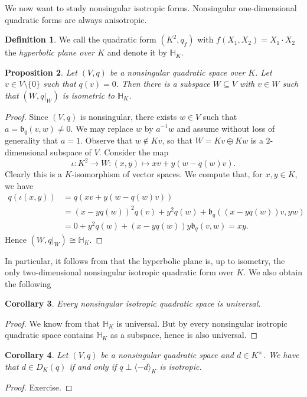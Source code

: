 \documentclass[12pt, leqno, british]{amsart}
\theoremstyle{definition}
\newtheorem{defi}{Definition}[subsection]
\theoremstyle{plain}
\newtheorem{prop}[defi]{Proposition}
\newtheorem{cor}[defi]{Corollary}
\theoremstyle{remark}
\newcommand{\mf}{\mathfrak}
\newcommand{\mbb}{\mathbb}
\begin{document}
We now want to study nonsingular isotropic forms.
Nonsingular one-dimensional quadratic forms are always anisotropic.
\begin{defi}
We call the quadratic form $(K^2, q_f)$ with $f(X_1, X_2) = X_1 \cdot X_2$ the \emph{hyperbolic plane over $K$} and denote it by $\mbb{H}_K$.
\end{defi}
\begin{prop}\label{P:hyperbolic-plane}
Let $(V, q)$ be a nonsingular quadratic space over $K$.
Let $v \in V \setminus \lbrace 0 \rbrace$ such that $q(v) = 0$.
Then there is a subspace $W \subseteq V$ with $v \in W$ such that $(W, q\vert_W)$ is isometric to $\mbb{H}_K$.
\end{prop}
\begin{proof}
Since $(V, q)$ is nonsingular, there exists $w \in V$ such that $a = \mf{b}_q(v, w) \neq 0$.
We may replace $w$ by $a^{-1}w$ and assume without loss of generality that $a = 1$.
Observe that $w \not\in Kv$, so that $W = Kv \oplus Kw$ is a $2$-dimensional subspace of $V$.
Consider the map
$$ \iota : K^2 \to W : (x, y) \mapsto xv + y(w - q(w)v).$$
Clearly this is a $K$-isomorphism of vector spaces.
We compute that, for $x, y \in K$, we have
\begin{align*}
q(\iota(x, y)) &= q(xv + y(w - q(w)v)) \\
&= (x-yq(w))^2 q(v) + y^2q(w) + \mf{b}_q((x - yq(w))v, yw) \\
&= 0 + y^2q(w) + (x - yq(w))y\mf{b}_q(v, w) = xy.
\end{align*}
Hence $(W, q\vert_W) \cong \mbb{H}_K$.
\end{proof}
In particular, it follows from  that the hyperbolic plane is, up to isometry, the only two-dimensional nonsingular isotropic quadratic form over $K$.
We also obtain the following
\begin{cor}\label{C:isotropic->universal}
Every nonsingular isotropic quadratic space is universal.
\end{cor}
\begin{proof}
We know from  that $\mbb{H}_K$ is universal.
But by  every nonsingular isotropic quadratic space contains $\mbb{H}_K$ as a subspace, hence is also universal.
\end{proof}
\begin{cor}\label{C:representation-theorem}
Let $(V, q)$ be a nonsingular quadratic space and $d \in K^\times$.
We have that $d \in D_K(q)$ if and only if $q \perp \langle -d \rangle_K$ is isotropic.
\end{cor}
\begin{proof}
Exercise.
\end{proof}
\end{document}
